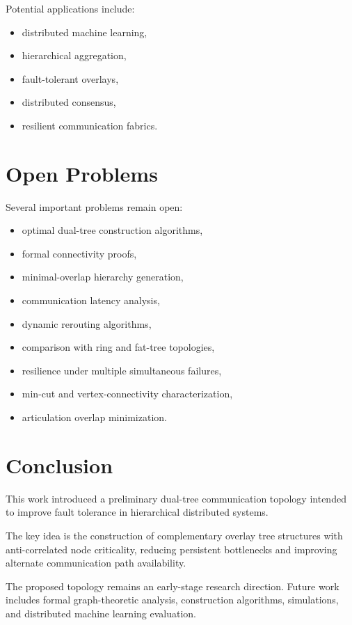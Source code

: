 \documentclass[11pt]{article}
\begin{document}
Potential applications include:

\begin{itemize}
    \item distributed machine learning,
    \item hierarchical aggregation,
    \item fault-tolerant overlays,
    \item distributed consensus,
    \item resilient communication fabrics.
\end{itemize}

\section{Open Problems}

Several important problems remain open:

\begin{itemize}
    \item optimal dual-tree construction algorithms,
    \item formal connectivity proofs,
    \item minimal-overlap hierarchy generation,
    \item communication latency analysis,
    \item dynamic rerouting algorithms,
    \item comparison with ring and fat-tree topologies,
    \item resilience under multiple simultaneous failures,
    \item min-cut and vertex-connectivity characterization,
    \item articulation overlap minimization.
\end{itemize}

\section{Conclusion}

This work introduced a preliminary dual-tree communication topology intended to improve fault tolerance in hierarchical distributed systems.

The key idea is the construction of complementary overlay tree structures with anti-correlated node criticality, reducing persistent bottlenecks and improving alternate communication path availability.

The proposed topology remains an early-stage research direction. Future work includes formal graph-theoretic analysis, construction algorithms, simulations, and distributed machine learning evaluation.
\end{document}
